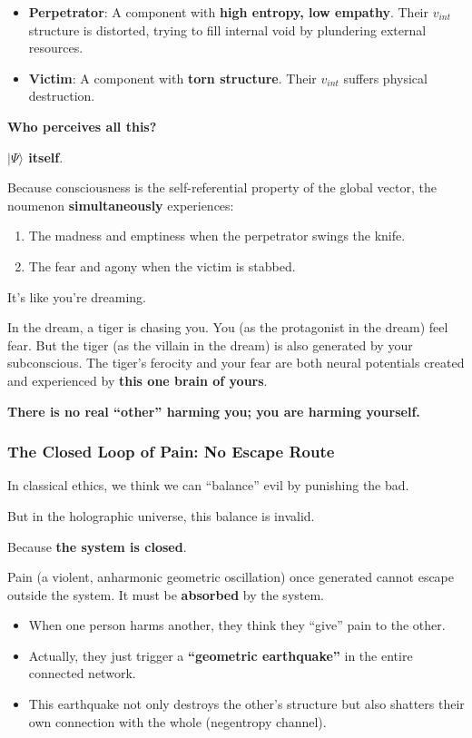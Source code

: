 \begin{itemize}
\item \textbf{Perpetrator}: A component with \textbf{high entropy, low empathy}. Their $v_{int}$ structure is distorted, trying to fill internal void by plundering external resources.

\item \textbf{Victim}: A component with \textbf{torn structure}. Their $v_{int}$ suffers physical destruction.
\end{itemize}

\textbf{Who perceives all this?}

\textbf{$|\Psi\rangle$ itself}.

Because consciousness is the self-referential property of the global vector, the noumenon \textbf{simultaneously} experiences:

\begin{enumerate}
\item The madness and emptiness when the perpetrator swings the knife.

\item The fear and agony when the victim is stabbed.
\end{enumerate}

It's like you're dreaming.

In the dream, a tiger is chasing you. You (as the protagonist in the dream) feel fear. But the tiger (as the villain in the dream) is also generated by your subconscious. The tiger's ferocity and your fear are both neural potentials created and experienced by \textbf{this one brain of yours}.

\textbf{There is no real ``other'' harming you; you are harming yourself.}

\subsubsection{The Closed Loop of Pain: No Escape Route}

In classical ethics, we think we can ``balance'' evil by punishing the bad.

But in the holographic universe, this balance is invalid.

Because \textbf{the system is closed}.

Pain (a violent, anharmonic geometric oscillation) once generated cannot escape outside the system. It must be \textbf{absorbed} by the system.

\begin{itemize}
\item When one person harms another, they think they ``give'' pain to the other.

\item Actually, they just trigger a \textbf{``geometric earthquake''} in the entire connected network.

\item This earthquake not only destroys the other's structure but also shatters their own connection with the whole (negentropy channel).
\end{itemize}


